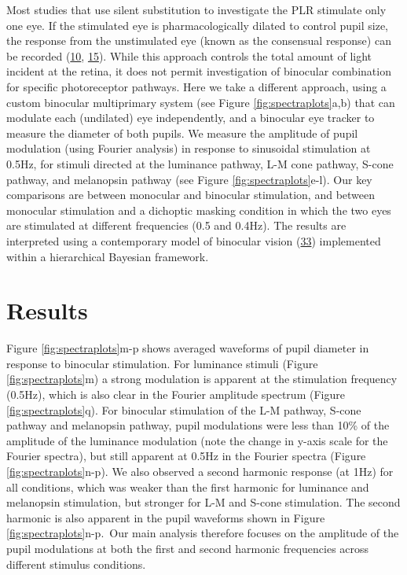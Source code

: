 \documentclass[
]{article}
\begin{document}
Most studies that use silent substitution to investigate the PLR stimulate only one eye. If the stimulated eye is pharmacologically dilated to control pupil size, the response from the unstimulated eye (known as the consensual response) can be recorded (\protect\hyperlink{ref-Spitschan2014}{10}, \protect\hyperlink{ref-McDougal2010}{15}). While this approach controls the total amount of light incident at the retina, it does not permit investigation of binocular combination for specific photoreceptor pathways. Here we take a different approach, using a custom binocular multiprimary system (see Figure \ref{fig:spectraplots}a,b) that can modulate each (undilated) eye independently, and a binocular eye tracker to measure the diameter of both pupils. We measure the amplitude of pupil modulation (using Fourier analysis) in response to sinusoidal stimulation at 0.5Hz, for stimuli directed at the luminance pathway, L-M cone pathway, S-cone pathway, and melanopsin pathway (see Figure \ref{fig:spectraplots}e-l). Our key comparisons are between monocular and binocular stimulation, and between monocular stimulation and a dichoptic masking condition in which the two eyes are stimulated at different frequencies (0.5 and 0.4Hz). The results are interpreted using a contemporary model of binocular vision (\protect\hyperlink{ref-Meese2006}{33}) implemented within a hierarchical Bayesian framework.

\hypertarget{results}{%
\section{Results}\label{results}}

Figure \ref{fig:spectraplots}m-p shows averaged waveforms of pupil diameter in response to binocular stimulation. For luminance stimuli (Figure \ref{fig:spectraplots}m) a strong modulation is apparent at the stimulation frequency (0.5Hz), which is also clear in the Fourier amplitude spectrum (Figure \ref{fig:spectraplots}q). For binocular stimulation of the L-M pathway, S-cone pathway and melanopsin pathway, pupil modulations were less than 10\% of the amplitude of the luminance modulation (note the change in y-axis scale for the Fourier spectra), but still apparent at 0.5Hz in the Fourier spectra (Figure \ref{fig:spectraplots}n-p). We also observed a second harmonic response (at 1Hz) for all conditions, which was weaker than the first harmonic for luminance and melanopsin stimulation, but stronger for L-M and S-cone stimulation. The second harmonic is also apparent in the pupil waveforms shown in Figure \ref{fig:spectraplots}n-p.~Our main analysis therefore focuses on the amplitude of the pupil modulations at both the first and second harmonic frequencies across different stimulus conditions.
\end{document}
